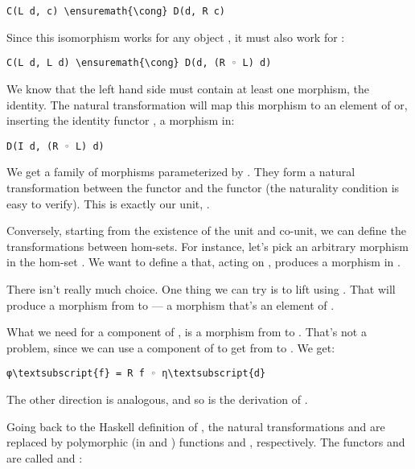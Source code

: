 \begin{Verbatim}[commandchars=\\\{\}]
C(L d, c) \ensuremath{\cong} D(d, R c)
\end{Verbatim}
Since this isomorphism works for any object , it must also
work for :

\begin{Verbatim}[commandchars=\\\{\}]
C(L d, L d) \ensuremath{\cong} D(d, (R ◦ L) d)
\end{Verbatim}
We know that the left hand side must contain at least one morphism, the
identity. The natural transformation will map this morphism to an
element of  or, inserting the identity
functor , a morphism in:

\begin{Verbatim}[commandchars=\\\{\}]
D(I d, (R ◦ L) d)
\end{Verbatim}
We get a family of morphisms parameterized by . They form a
natural transformation between the functor  and the functor
 (the naturality condition is easy to verify). This is
exactly our unit, .

Conversely, starting from the existence of the unit and co-unit, we can
define the transformations between hom-sets. For instance, let's pick an
arbitrary morphism  in the hom-set . We
want to define a  that, acting on , produces a
morphism in .

There isn't really much choice. One thing we can try is to lift
 using . That will produce a morphism 
from  to  --- a morphism that's an
element of .

What we need for a component of , is a morphism from
 to . That's not a problem, since we can use a
component of  to get from  to
. We get:

\begin{Verbatim}[commandchars=\\\{\}]
φ\textsubscript{f} = R f ◦ η\textsubscript{d}
\end{Verbatim}
The other direction is analogous, and so is the derivation of
.

Going back to the Haskell definition of , the natural
transformations  and  are replaced by polymorphic
(in  and ) functions  and
, respectively. The functors  and
 are called  and :

